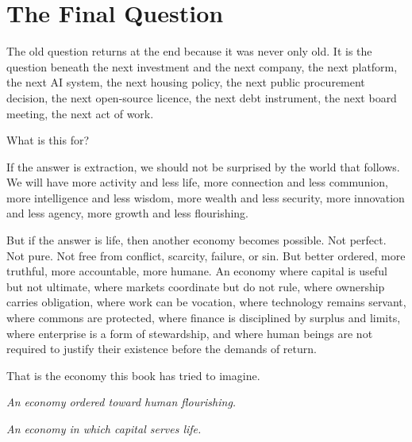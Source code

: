 \documentclass[11pt,a4paper,oneside]{book}
\begin{document}
\section*{The Final Question}

The old question returns at the end because it was never only old. It is the question beneath the next investment and the next company, the next platform, the next AI system, the next housing policy, the next public procurement decision, the next open-source licence, the next debt instrument, the next board meeting, the next act of work.

What is this for?

If the answer is extraction, we should not be surprised by the world that follows. We will have more activity and less life, more connection and less communion, more intelligence and less wisdom, more wealth and less security, more innovation and less agency, more growth and less flourishing.

But if the answer is life, then another economy becomes possible. Not perfect. Not pure. Not free from conflict, scarcity, failure, or sin. But better ordered, more truthful, more accountable, more humane. An economy where capital is useful but not ultimate, where markets coordinate but do not rule, where ownership carries obligation, where work can be vocation, where technology remains servant, where commons are protected, where finance is disciplined by surplus and limits, where enterprise is a form of stewardship, and where human beings are not required to justify their existence before the demands of return.

That is the economy this book has tried to imagine.

\begin{center}\itshape An economy ordered toward human flourishing.\end{center}

\begin{center}\itshape An economy in which capital serves life.\end{center}
\end{document}

